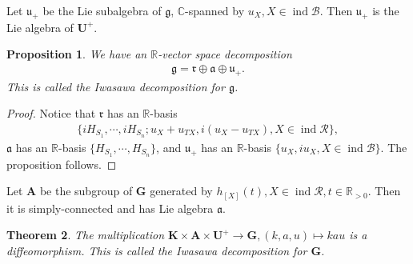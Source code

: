 \documentclass[10pt,a4paper]{amsart}
\newtheorem{theorem}{Theorem}[section]
\newtheorem{proposition}[theorem]{Proposition}
\begin{document}
Let $\mathfrak{u}_+$ be the Lie subalgebra of $\mathfrak{g}$, $\mathbb{C}$-spanned by $u_X,X\in \operatorname{ind}\mathcal{B}$.
Then $\mathfrak{u}_+$ is the Lie algebra of $\mathbf{U}^+$.

\begin{proposition}
    We have an $\mathbb{R}$-vector space decomposition
    \begin{align*}
        \mathfrak{g}=\mathfrak{r}\oplus \mathfrak{a} \oplus \mathfrak{u}_+.
    \end{align*}
    This is called the Iwasawa decomposition for $\mathfrak{g}$.
\end{proposition}

\begin{proof}
    Notice that $\mathfrak{r}$ has an $\mathbb{R}$-basis
    \begin{align*}
         \{iH_{S_1},\cdots,iH_{S_n};u_X+u_{TX},i(u_X-u_{TX}),X\in \operatorname{ind}\mathcal{R}\},
    \end{align*}
    $\mathfrak{a}$ has an $\mathbb{R}$-basis $\{H_{S_1},\cdots,H_{S_n}\}$, and $\mathfrak{u}_+$ has an $\mathbb{R}$-basis $\{u_X,iu_X,X\in \operatorname{ind}\mathcal{B}\}$.
     The proposition follows.
\end{proof}

Let $\mathbf{A}$ be the subgroup of $\mathbf{G}$ generated by $h_{[X]}(t),X\in\operatorname{ind}\mathcal{R},t\in \mathbb{R}_{>0}$.
Then it is simply-connected and has Lie algebra $\mathfrak{a}$.


\begin{theorem}
    The multiplication $\mathbf{K}\times \mathbf{A}\times \mathbf{U}^+ \rightarrow \mathbf{G}, (k,a,u)\mapsto kau$ is a diffeomorphism.
    This is called the Iwasawa decomposition for $\mathbf{G}$.
\end{theorem}
\end{document}
